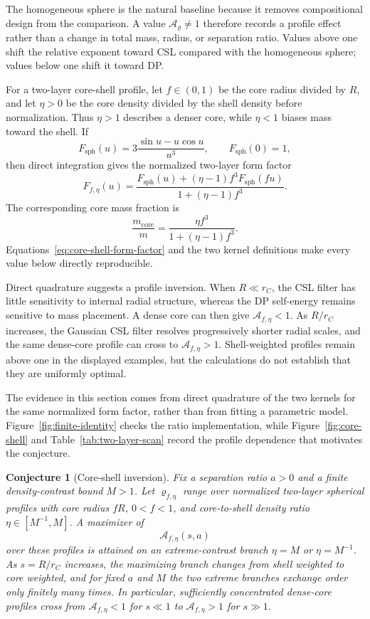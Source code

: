 \documentclass[
  aps,
  prd,
  preprint,
  notitlepage,
  superscriptaddress,
  nofootinbib,
  longbibliography
]{revtex4-2}
\newtheorem{conjecture}{Conjecture}
\begin{document}
The homogeneous sphere is the natural baseline because it removes compositional design from the comparison. A value $\mathcal A_\varrho\ne1$ therefore records a profile effect rather than a change in total mass, radius, or separation ratio. Values above one shift the relative exponent toward CSL compared with the homogeneous sphere; values below one shift it toward DP.

For a two-layer core-shell profile, let $f\in(0,1)$ be the core radius divided by $R$, and let $\eta>0$ be the core density divided by the shell density before normalization. Thus $\eta>1$ describes a denser core, while $\eta<1$ biases mass toward the shell. If
\[
F_{\mathrm{sph}}(u)=3\frac{\sin u-u\cos u}{u^3},
\qquad F_{\mathrm{sph}}(0)=1,
\]
then direct integration gives the normalized two-layer form factor
\begin{equation}
F_{f,\eta}(u)
=\frac{F_{\mathrm{sph}}(u)+(\eta-1)f^3F_{\mathrm{sph}}(fu)}
{1+(\eta-1)f^3}.
\label{eq:core-shell-form-factor}
\end{equation}
The corresponding core mass fraction is
\[
\frac{m_{\mathrm{core}}}{m}
=\frac{\eta f^3}{1+(\eta-1)f^3}.
\]
Equations~\eqref{eq:core-shell-form-factor} and the two kernel definitions make every value below directly reproducible.

Direct quadrature suggests a profile inversion. When $R\ll r_C$, the CSL filter has little sensitivity to internal radial structure, whereas the DP self-energy remains sensitive to mass placement. A dense core can then give $\mathcal A_{f,\eta}<1$. As $R/r_C$ increases, the Gaussian CSL filter resolves progressively shorter radial scales, and the same dense-core profile can cross to $\mathcal A_{f,\eta}>1$. Shell-weighted profiles remain above one in the displayed examples, but the calculations do not establish that they are uniformly optimal.

The evidence in this section comes from direct quadrature of the two kernels for the same normalized form factor, rather than from fitting a parametric model. Figure~\ref{fig:finite-identity} checks the ratio implementation, while Figure~\ref{fig:core-shell} and Table~\ref{tab:two-layer-scan} record the profile dependence that motivates the conjecture.

\begin{conjecture}[Core-shell inversion]
Fix a separation ratio $a>0$ and a finite density-contrast bound $M>1$. Let $\varrho_{f,\eta}$ range over normalized two-layer spherical profiles with core radius $fR$, $0<f<1$, and core-to-shell density ratio $\eta\in[M^{-1},M]$. A maximizer of
\[
\mathcal A_{f,\eta}(s,a)
\]
over these profiles is attained on an extreme-contrast branch $\eta=M$ or $\eta=M^{-1}$. As $s=R/r_C$ increases, the maximizing branch changes from shell weighted to core weighted, and for fixed $a$ and $M$ the two extreme branches exchange order only finitely many times. In particular, sufficiently concentrated dense-core profiles cross from $\mathcal A_{f,\eta}<1$ for $s\ll1$ to $\mathcal A_{f,\eta}>1$ for $s\gg1$.
\end{conjecture}
\end{document}
